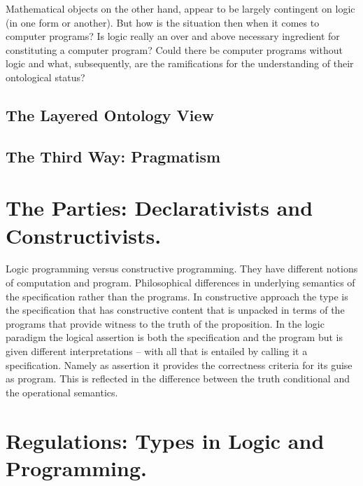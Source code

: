 \documentclass[]{article}
\begin{document}
Mathematical objects on the other hand, appear to be largely contingent on logic (in one form or another). But how is the situation then when it comes to computer programs? Is logic really an over and above necessary ingredient for constituting a computer program? Could there be computer programs without logic and what, subsequently, are the ramifications for the understanding of their ontological status?

\subsection{The Layered Ontology View}


{\color{red}{this passage follows on Nicola's and Giuseppe's work for SEP}}

\subsection{The Third Way: Pragmatism}


{\color{red}{this passage does not exist. A student of mine is doing some work in this direction, wonder whether we should explore.}}



\section{The Parties: Declarativists and Constructivists.}


{\color{red}{Ray's}}

Logic programming versus constructive programming. They have different notions of computation and program. Philosophical differences in underlying semantics of the specification rather than the programs. In constructive approach the type is the specification that has constructive content that is unpacked in terms of the programs that provide witness to the truth of the proposition. In the logic paradigm the logical assertion is both the specification and the program but is given different interpretations – with all that is entailed by calling it a specification. Namely as assertion it provides the correctness criteria for its guise as program. This is reflected in the difference between the truth conditional and the operational semantics. 



\section{Regulations: Types in Logic and Programming.}
\end{document}
